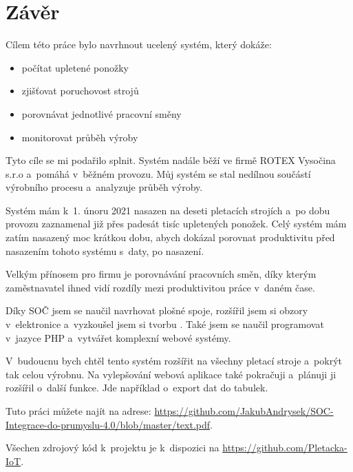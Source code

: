 \chapter*{Závěr}

Cílem této práce bylo navrhnout ucelený systém, který dokáže:

\begin{itemize}
    \item počítat upletené ponožky
    \item zjišťovat poruchovost strojů
    \item porovnávat jednotlivé pracovní směny
    \item monitorovat průběh výroby
\end{itemize}

Tyto cíle se mi podařilo splnit. Systém nadále běží ve firmě ROTEX Vysočina s.r.o\cite{ROTEX} a~pomáhá v~běžném provozu.
Můj systém se stal nedílnou součástí výrobního procesu a~analyzuje průběh výroby.

Systém mám k~1. únoru 2021 nasazen na deseti pletacích strojích a~po dobu provozu zaznamenal již přes padesát tisíc upletených ponožek.
Celý systém mám zatím nasazený moc krátkou dobu, abych dokázal porovnat produktivitu před nasazením tohoto systému s~daty, po nasazení.

Velkým přínosem pro firmu je porovnávání pracovních směn, díky kterým zaměstnavatel ihned vidí rozdíly mezi produktivitou práce v~daném čase.

Díky SOČ jsem se naučil navrhovat plošné spoje, rozšířil jsem si obzory v~elektronice a~vyzkoušel jsem si tvorbu . 
Také jsem se naučil programovat v~jazyce PHP a~vytvářet komplexní webové systémy.

V~budoucnu bych chtěl tento systém rozšířit na všechny pletací stroje a~pokrýt tak celou výrobnu.
Na vylepšování webová aplikace také pokračuji a~plánuji ji rozšířil o~další funkce. Jde například o~export dat do tabulek.

Tuto práci můžete najít na adrese: \url{https://github.com/JakubAndrysek/SOC-Integrace-do-prumyslu-4.0/blob/master/text.pdf}.

Všechen zdrojový kód k~projektu je k~dispozici na \url{https://github.com/Pletacka-IoT}.


\newpage